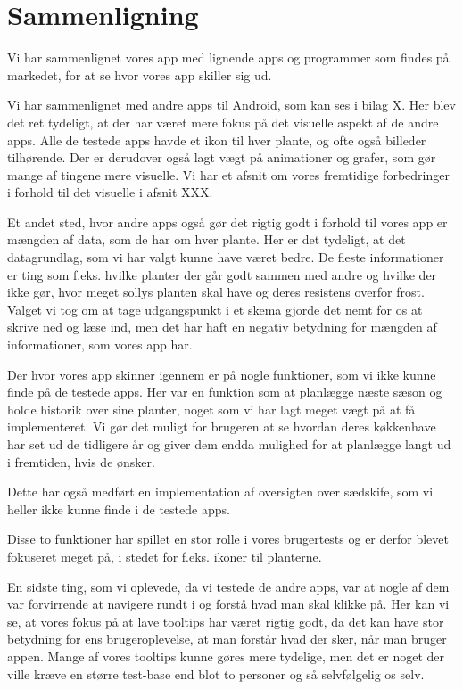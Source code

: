 \section{Sammenligning}
Vi har sammenlignet vores app med lignende apps og programmer som findes på markedet, for at se hvor vores app skiller sig ud.

Vi har sammenlignet med andre apps til Android, som kan ses i bilag X. Her blev det ret tydeligt, at der har været mere fokus på det visuelle aspekt af de andre apps. Alle de testede apps havde et ikon til hver plante, og ofte også billeder tilhørende. Der er derudover også lagt vægt på animationer og grafer, som gør mange af tingene mere visuelle. Vi har et afsnit om vores fremtidige forbedringer i forhold til det visuelle i afsnit XXX.

Et andet sted, hvor andre apps også gør det rigtig godt i forhold til vores app er mængden af data, som de har om hver plante. Her er det tydeligt, at det datagrundlag, som vi har valgt kunne have været bedre. De fleste informationer er ting som f.eks. hvilke planter der går godt sammen med andre og hvilke der ikke gør, hvor meget sollys planten skal have og deres resistens overfor frost. Valget vi tog om at tage udgangspunkt i et skema gjorde det nemt for os at skrive ned og læse ind, men det har haft en negativ betydning for mængden af informationer, som vores app har.

Der hvor vores app skinner igennem er på nogle funktioner, som vi ikke kunne finde på de testede apps. Her var en funktion som at planlægge næste sæson og holde historik over sine planter, noget som vi har lagt meget vægt på at få implementeret. Vi gør det muligt for brugeren at se hvordan deres køkkenhave har set ud de tidligere år og giver dem endda mulighed for at planlægge langt ud i fremtiden, hvis de ønsker.

Dette har også medført en implementation af oversigten over sædskife, som vi heller ikke kunne finde i de testede apps.

Disse to funktioner har spillet en stor rolle i vores brugertests og er derfor blevet fokuseret meget på, i stedet for f.eks. ikoner til planterne.

En sidste ting, som vi oplevede, da vi testede de andre apps, var at nogle af dem var forvirrende at navigere rundt i og forstå hvad man skal klikke på. Her kan vi se, at vores fokus på at lave tooltips har været rigtig godt, da det kan have stor betydning for ens brugeroplevelse, at man forstår hvad der sker, når man bruger appen. Mange af vores tooltips kunne gøres mere tydelige, men det er noget der ville kræve en større test-base end blot to personer og så selvfølgelig os selv.
